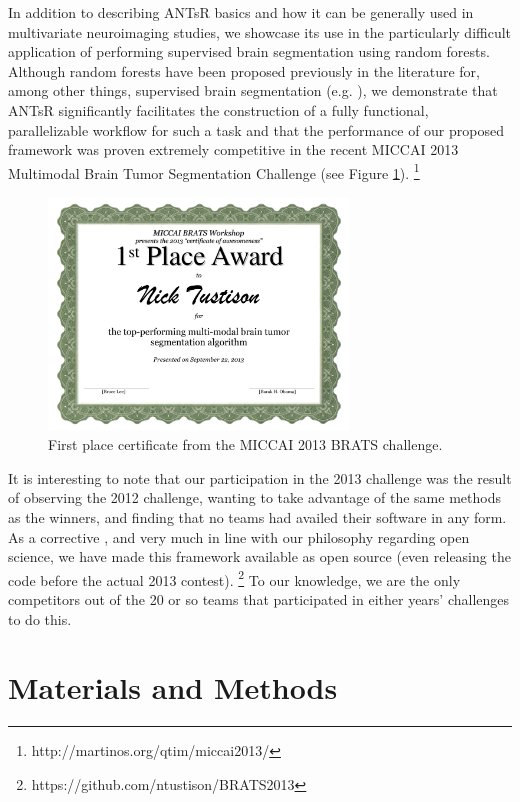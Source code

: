 \documentclass[final,5p,times,twocolumn]{elsarticle}
\begin{document}
In addition to describing ANTsR basics and how it can be generally
used in multivariate neuroimaging studies, we showcase its use in
the particularly difficult application of performing supervised brain
segmentation using random forests.  Although random forests have
been proposed previously in the literature for, among other things, 
supervised brain segmentation (e.g. \cite{geremia2011,zikic2012}), 
we demonstrate that ANTsR significantly facilitates the construction 
of a fully functional, parallelizable workflow for such a task and 
that the performance of our proposed framework was proven extremely 
competitive in the recent MICCAI 2013 Multimodal Brain Tumor Segmentation
Challenge (see Figure \ref{fig:award}).%
\footnote{
http://martinos.org/qtim/miccai2013/
}
\begin{figure}
  \centering
  \includegraphics[width=80mm]{Figures/award.pdf}
  \caption{First place certificate from the MICCAI 2013 BRATS challenge.}
  \label{fig:award}
\end{figure}

It is interesting to note that our participation in the 2013 challenge
was the result of observing the 2012
challenge, wanting to take advantage of the same methods as the winners,
and finding that no teams had availed their software in any form.  As a 
corrective \citep{ince2012}, and very much in line with our philosophy 
regarding open science, we have made this framework available as open 
source (even releasing the code before the actual 2013 contest).%
\footnote{
https://github.com/ntustison/BRATS2013
}
To our knowledge, we are the only competitors out of the 20 or so teams 
that participated in either years' challenges to do this.

\section{Materials and Methods}
\end{document}
